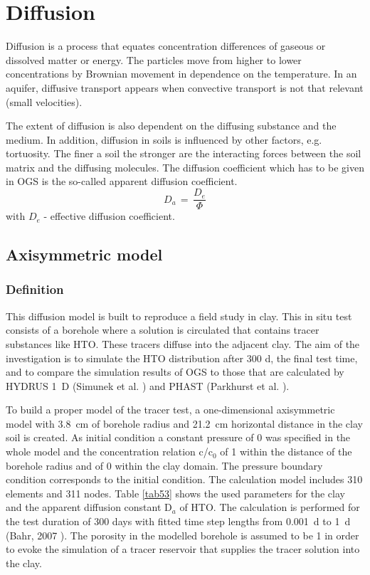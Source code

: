 \section{Diffusion}

Diffusion is a process that equates concentration differences of gaseous or dissolved matter or energy. The particles move from higher to lower concentrations by Brownian movement in dependence on the temperature. In an aquifer, diffusive transport appears when convective transport is not that relevant (small velocities).

The extent of diffusion is also dependent on the diffusing substance and the medium. In addition, diffusion in soils is influenced by other factors, e.g. tortuosity. The finer a soil the stronger are the interacting forces between the soil matrix and the diffusing molecules. The diffusion coefficient which has to be given in OGS is the so-called apparent diffusion coefficient.
%
\begin{equation}
D_a\,=\,\frac{D_e}{\Phi}
\label{eq511}
\end{equation}
{\small
with $D_e$ - effective diffusion coefficient.
}

\subsection{Axisymmetric model}

\subsubsection{Definition}

This diffusion model is built to reproduce a field study in clay. This in situ test consists of a borehole where a solution is circulated that contains tracer substances like HTO. These tracers diffuse into the adjacent clay. The aim of the investigation is to simulate the HTO distribution after 300 d, the final test time, and to compare the simulation results of OGS to those that are calculated by HYDRUS 1~D (Simunek et al. \cite{Simunek}) and PHAST (Parkhurst et al. \cite{Parkhurst}).

To build a proper model of the tracer test, a one-dimensional axisymmetric model with 3.8~cm of borehole radius and 21.2~cm horizontal distance in the clay soil is created. As initial condition a constant pressure of 0 was specified in the whole model and the concentration relation c/c$_0$ of 1 within the distance of the borehole radius and of 0 within the clay domain. The pressure boundary condition corresponds to the initial condition. The calculation model includes 310 elements and 311 nodes. Table \ref{tab53} shows the used parameters for the clay and the apparent diffusion constant D$_a$ of HTO. The calculation is performed for the test duration of 300 days with fitted time step lengths from 0.001~d to 1~d (Bahr, 2007 \cite{Bahr:2007}). The porosity in the modelled borehole is assumed to be 1 in order to evoke the simulation of a tracer reservoir that supplies the tracer solution into the clay.

